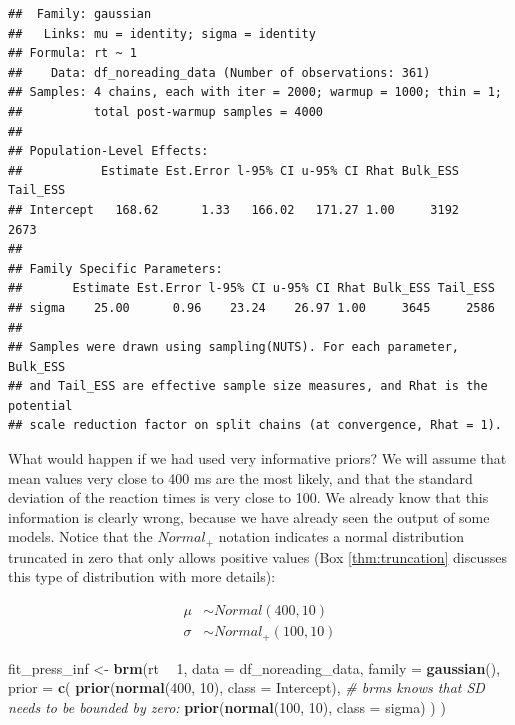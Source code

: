 \documentclass[12pt,]{krantz}
\newenvironment{Shaded}{\begin{snugshade}}{\end{snugshade}}
\newcommand{\CommentTok}[1]{\textcolor[rgb]{0.56,0.35,0.01}{\textit{#1}}}
\newcommand{\DataTypeTok}[1]{\textcolor[rgb]{0.13,0.29,0.53}{#1}}
\newcommand{\DecValTok}[1]{\textcolor[rgb]{0.00,0.00,0.81}{#1}}
\newcommand{\KeywordTok}[1]{\textcolor[rgb]{0.13,0.29,0.53}{\textbf{#1}}}
\newcommand{\NormalTok}[1]{#1}
\newcommand{\OperatorTok}[1]{\textcolor[rgb]{0.81,0.36,0.00}{\textbf{#1}}}
\newcommand{\StringTok}[1]{\textcolor[rgb]{0.31,0.60,0.02}{#1}}
\theoremstyle{definition}
\theoremstyle{definition}
\theoremstyle{definition}
\theoremstyle{remark}
\begin{document}
\begin{verbatim}
##  Family: gaussian 
##   Links: mu = identity; sigma = identity 
## Formula: rt ~ 1 
##    Data: df_noreading_data (Number of observations: 361) 
## Samples: 4 chains, each with iter = 2000; warmup = 1000; thin = 1;
##          total post-warmup samples = 4000
## 
## Population-Level Effects: 
##           Estimate Est.Error l-95% CI u-95% CI Rhat Bulk_ESS Tail_ESS
## Intercept   168.62      1.33   166.02   171.27 1.00     3192     2673
## 
## Family Specific Parameters: 
##       Estimate Est.Error l-95% CI u-95% CI Rhat Bulk_ESS Tail_ESS
## sigma    25.00      0.96    23.24    26.97 1.00     3645     2586
## 
## Samples were drawn using sampling(NUTS). For each parameter, Bulk_ESS
## and Tail_ESS are effective sample size measures, and Rhat is the potential
## scale reduction factor on split chains (at convergence, Rhat = 1).
\end{verbatim}

What would happen if we had used very informative priors? We will assume that mean values very close to 400 ms are the most likely, and that the standard deviation of the reaction times is very close to 100. We already know that this information is clearly wrong, because we have already seen the output of some models. Notice that the \(Normal_+\) notation indicates a normal distribution truncated in zero that only allows positive values (Box \ref{thm:truncation} discusses this type of distribution with more details):

\begin{equation}
\begin{aligned}
\mu &\sim Normal(400, 10) \\
\sigma &\sim Normal_+(100, 10) 
\end{aligned}
\label{eq:infrtpriors}
\end{equation}

\begin{Shaded}
\begin{Highlighting}[]
\NormalTok{fit_press_inf <-}\StringTok{ }\KeywordTok{brm}\NormalTok{(rt }\OperatorTok{~}\StringTok{ }\DecValTok{1}\NormalTok{,}
  \DataTypeTok{data =}\NormalTok{ df_noreading_data,}
  \DataTypeTok{family =} \KeywordTok{gaussian}\NormalTok{(),}
  \DataTypeTok{prior =} \KeywordTok{c}\NormalTok{(}
    \KeywordTok{prior}\NormalTok{(}\KeywordTok{normal}\NormalTok{(}\DecValTok{400}\NormalTok{, }\DecValTok{10}\NormalTok{), }\DataTypeTok{class =}\NormalTok{ Intercept),}
    \CommentTok{# brms knows that SD needs to be bounded by zero:}
    \KeywordTok{prior}\NormalTok{(}\KeywordTok{normal}\NormalTok{(}\DecValTok{100}\NormalTok{, }\DecValTok{10}\NormalTok{), }\DataTypeTok{class =}\NormalTok{ sigma)}
\NormalTok{  )}
\NormalTok{)}
\end{Highlighting}
\end{Shaded}
\end{document}
